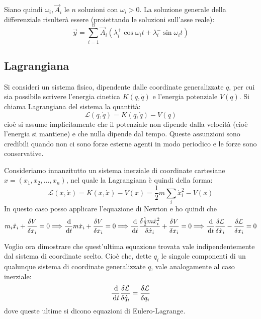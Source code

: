 \documentclass[../main.tex]{subfiles}
\begin{document}
Siano quindi $\omega_i, \vec A_i$ le $n$ soluzioni con $\omega_i>0$.
La soluzione generale della differenziale risulterà essere (proiettando le soluzioni sull'asse reale):
\begin{equation}\label{opgl:Soluzioni}
	\vec y = \sum_{i=1}^n \vec A_i\left( \lambda^+_i\cos\omega_i t + \lambda^-_i\sin \omega_i t \right)
\end{equation}

\subsection{Lagrangiana}\label{lag}
Si consideri un sistema fisico, dipendente dalle coordinate generalizzate $q$, per cui sia possibile scrivere l'energia cinetica $K(q,\dot q)$ e l'energia potenziale $V(q)$.
Si chiama Lagrangiana del sistema la quantità:
\begin{equation}\label{lag:Definizione}
	\mathcal L(q,\dot q)=K(q,\dot q)-V(q)
\end{equation}
cioè si assume implicitamente che il potenziale non dipende dalla velocità (cioè l'energia si mantiene) e che nulla dipende dal tempo. Queste assunzioni sono credibili quando non ci sono forze esterne agenti in modo periodico e le forze sono conservative.

Consideriamo innanzitutto un sistema inerziale di coordinate cartesiane $x=(x_1,x_2,\dots,x_n)$, nel quale la Lagrangiana è quindi della forma:
\begin{equation*}
	\mathcal L(x,\dot x)=K(x,\dot x)-V(x)=\frac 12 m \sum_i\dot x_i^2-V(x)
\end{equation*}
In questo caso posso applicare l'equazione di Newton e ho quindi che 
\begin{equation*}
	m_i\ddot x_i+\frac{\delta V}{\delta x_i}=0 \Longrightarrow \frac{\,\mathrm{d}}{\,\mathrm{d} t} m\dot x_i +\frac{\delta V}{\delta x_i}=0 \Longrightarrow \frac{\,\mathrm{d}}{\,\mathrm{d} t} \frac{\delta \frac 12 m \dot x_i^2}{\delta \dot x_i} +\frac{\delta V}{\delta x_i}=0 \Longrightarrow \frac{\,\mathrm{d}}{\,\mathrm{d} t} \frac{\delta \mathcal L}{\delta \dot x_i} - \frac{\delta \mathcal L}{\delta x_i} =0
\end{equation*}

Voglio ora dimostrare che quest'ultima equazione trovata vale indipendentemente dal sistema di coordinate scelto. Cioè che, dette $q_i$ le singole componenti di un qualunque sistema di coordinate generalizzate $q$, vale analogamente al caso inerziale:
\begin{equation}\label{Lag:EqEuleroLagrange}
	\frac{\,\mathrm{d}}{\,\mathrm{d} t} \frac{\delta \mathcal L}{\delta \dot q_i} = \frac{\delta \mathcal L}{\delta q_i}
\end{equation}
dove queste ultime si dicono equazioni di Eulero-Lagrange.
\end{document}
